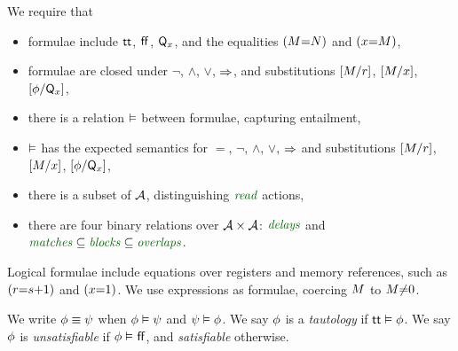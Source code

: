 We require that
\begin{itemize}
\item formulae include $\mathsf{tt}$, $\mkern.6mu\mathsf{ff}\mkern.6mu$, $\mathsf{Q}_{x}$, and the equalities $(M{=}N)$ and $(x{=}M)$,
\item formulae are closed under $\lnot$, $\land$, $\lor$, $\mathbin{\Rightarrow}$, and
  substitutions $[M/r]$, $[M/x]$, $[\phi/\mathsf{Q}_{x}]$,
\item there is a relation $\mathrel{\vDash}$ between
  formulae, capturing entailment, %
\item $\mathrel{\vDash}$ has the expected semantics for $=$, $\lnot$,
  $\land$, $\lor$, $\mathbin{\Rightarrow}$ and substitutions $[M/r]$,
  $[M/x]$, $[\phi/\mathsf{Q}_{x}]$,
\item there is a subset of $\mathcal{A}$, distinguishing
  $\sreaddef$ actions,
\item there are four binary relations over $\mathcal{A}\times\mathcal{A}$:
  $\rdelaysdef$ and ${\rmatchesdef}\subseteq{\rblocksdef}\subseteq{\roverlapsdef}$.
\end{itemize}

Logical formulae include equations over registers and memory references, such as
$(r{=}s{+}1)$ and $(x{=}1)$.
We use expressions as formulae, coercing $M$ to $M{\neq}0$.


We write $\phi\mathrel{\equiv}\psi$ when $\phi\mathrel{\vDash}\psi$ and $\psi\mathrel{\vDash}\phi$.
We say
$\phi$ is a \emph{tautology} if $\mathsf{tt} \mathrel{\vDash} \phi$.
We say
$\phi$ is \emph{unsatisfiable} if $\phi \mathrel{\vDash} \mkern.6mu\mathsf{ff}\mkern.6mu$, and
\emph{satisfiable} otherwise.




